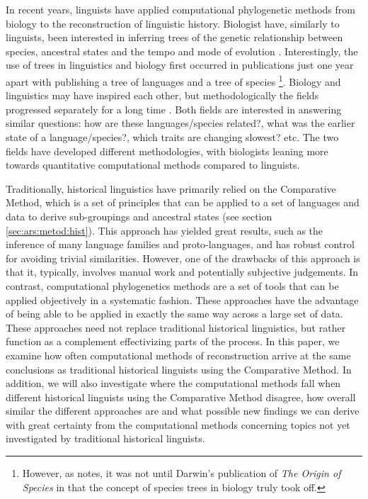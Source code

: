 \documentclass[draft,10pt]{article} %
\begin{document}
In recent years, linguists have applied computational phylogenetic methods from biology to the reconstruction of linguistic history. Biologist have, similarly to linguists, been interested in inferring trees of the genetic relationship between species, ancestral states and the tempo and mode of evolution \citep{atkinson2005curious}. Interestingly, the use of trees in linguistics and biology first occurred in publications just one year apart with \citet{schlegel1808sprache} publishing a tree of languages and \citet{lamarck1809philosophie} a tree of species \footnote{However, as 
 \citet[370]{greenhill2015evolution} notes, it was not until Darwin's publication of \emph{The Origin of Species} in  \citeyear{darwin1859origin} that the concept of species trees in biology truly took off.}. Biology and linguistics may have inspired each other, but methodologically the fields progressed separately for a long time \citep[370]{greenhill2015evolution}. Both fields are interested in answering similar questions: how are these languages/species related?, what was the earlier state of a language/species?, which traits are changing slowest? etc. The two fields have developed different methodologies, with biologists leaning more towards quantitative computational methods compared to linguists.
 
Traditionally, historical linguistics have primarily relied on the Comparative Method, which is a set of principles that can be applied to a set of languages and data to derive sub-groupings and ancestral states (see section \ref{sec:ars:metod:hist}). This approach has yielded great results, such as the inference of many language families and proto-languages, and has robust control for avoiding trivial similarities. However, one of the drawbacks of this approach is that it, typically, involves manual work and potentially subjective judgements. In contrast, computational phylogenetics methods are a set of tools that can be applied objectively in a systematic fashion. These approaches have the advantage of being able to be applied in exactly the same way across a large set of data. These approaches need not replace traditional historical linguistics, but rather function as a complement effectivizing parts of the process. In this paper, we examine how often computational methods of reconstruction arrive at the same conclusions as traditional historical linguists using the Comparative Method. In addition, we will also investigate where the computational methods fall when different historical linguists using the Comparative Method disagree, how overall similar the different approaches are and what possible new findings we can derive with great certainty from the computational methods concerning topics not yet investigated by traditional historical linguists.
\end{document}
